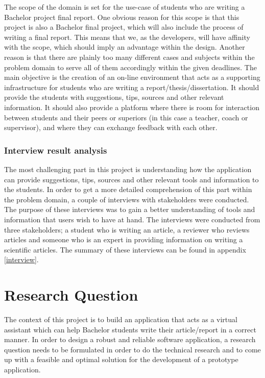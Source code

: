 The scope of the domain is set for the use-case of students who are writing a Bachelor project final report. One obvious reason for this scope is that this project is also a Bachelor final project, which will also include the process of writing a final report. This means that we, as the developers, will have affinity with the scope, which should imply an advantage within the design. Another reason is that there are plainly too many different cases and subjects within the problem domain to serve all of them accordingly within the given deadlines.
The main objective is the creation of an on-line environment that acts as a supporting infrastructure for students who are writing a report/thesis/dissertation. It should provide the students with suggestions, tips, sources and other relevant information. It should also provide a platform where there is room for interaction between students and their peers or superiors (in this case a teacher, coach or supervisor), and where they can exchange feedback with each other.

\subsubsection{Interview result analysis} %

The most challenging part in this project is understanding how the application can provide suggestions, tips, sources and other relevant tools and information to the students. In order to get a more detailed comprehension of this part within the problem domain, a couple of interviews with stakeholders were conducted. The purpose of these interviews was to gain a better understanding of tools and information that users wish to have at hand. The interviews were conducted from three stakeholders; a student who is writing an article, a reviewer who reviews articles and someone who is an expert in providing information on writing a scientific articles. The summary of these interviews can be found in appendix \ref{interview}.

\section{Research Question}

The context of this project is to build an application that acts as a virtual assistant which can help Bachelor students write their article/report in a correct manner. In order to design a robust and reliable software application, a research question needs to be formulated in order to do the technical research and to come up with a feasible and optimal solution for the development of a prototype application.\\

